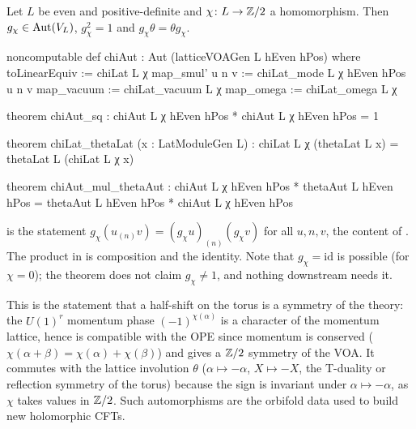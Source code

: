 \begin{theorem}\label{ch03:thm:chiAut}
Let $L$ be even and positive-definite and $\chi\colon L\to{\mathbb{Z}}/2$ a homomorphism. Then $g_\chi\in
\operatorname{Aut}(V_L)$, $g_\chi^2=1$ and $g_\chi\theta=\theta g_\chi$.
\end{theorem}
\begin{leancode}
noncomputable def chiAut : Aut (latticeVOAGen L hEven hPos) where
  toLinearEquiv := chiLat L χ
  map_smul' u n v := chiLat_mode L χ hEven hPos u n v
  map_vacuum := chiLat_vacuum L χ
  map_omega := chiLat_omega L χ

theorem chiAut_sq : chiAut L χ hEven hPos * chiAut L χ hEven hPos = 1

theorem chiLat_thetaLat (x : LatModuleGen L) :
    chiLat L χ (thetaLat L x) = thetaLat L (chiLat L χ x)

theorem chiAut_mul_thetaAut :
    chiAut L χ hEven hPos * thetaAut L hEven hPos = thetaAut L hEven hPos * chiAut L χ hEven hPos
\end{leancode}

\begin{dictionary}
 is the statement $g_\chi(u_{(n)}v)=(g_\chi u)_{(n)}(g_\chi v)$ for all
$u,n,v$, the content of . The product \lean{*} in  is composition and
 the identity. Note that $g_\chi=\mathrm{id}$ is possible (for $\chi=0$); the theorem does
not claim $g_\chi\ne1$, and nothing downstream needs it.
\end{dictionary}

\begin{physics}
This is the statement that a half-shift on the torus is a symmetry of the theory: the $U(1)^r$ momentum phase $(-1)^{\chi(\alpha)}$ is a character of the momentum lattice, hence is compatible with the OPE since momentum is conserved ($\chi(\alpha+\beta)=\chi(\alpha)+\chi(\beta)$) and gives a ${\mathbb{Z}}/2$ symmetry of the VOA. It commutes with the lattice involution $\theta$ ($\alpha\mapsto-\alpha$, $X\mapsto-X$, the T-duality or reflection symmetry of the torus) because the sign is invariant under $\alpha\mapsto-\alpha$, as $\chi$ takes values in ${\mathbb{Z}}/2$. Such automorphisms are the orbifold data used to build new holomorphic CFTs.
\end{physics}

